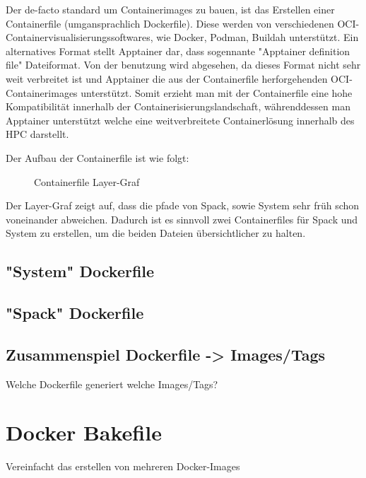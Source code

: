 Der de-facto standard um Containerimages zu bauen, ist das Erstellen einer Containerfile (umgansprachlich Dockerfile). Diese werden von verschiedenen OCI-Containervisualisierungssoftwares, wie Docker, Podman, Buildah unterstützt. Ein alternatives Format stellt Apptainer dar, dass sogennante "Apptainer definition file" Dateiformat. Von der benutzung wird abgesehen, da dieses Format nicht sehr weit verbreitet ist und Apptainer die aus der Containerfile herforgehenden OCI-Containerimages unterstützt. Somit erzieht man mit der Containerfile eine hohe Kompatibilität innerhalb der Containerisierungslandschaft, währenddessen man Apptainer unterstützt welche eine weitverbreitete Containerlösung innerhalb des HPC darstellt. 

Der Aufbau der Containerfile ist wie folgt:

\begin{figure}[!htbp]
    \centering
    
    \caption{Containerfile Layer-Graf}
\end{figure}

Der Layer-Graf zeigt auf, dass die pfade von Spack, sowie System sehr früh schon voneinander abweichen. Dadurch ist es sinnvoll zwei Containerfiles für Spack und System zu erstellen, um die beiden Dateien übersichtlicher zu halten. 

\subsection{"System" Dockerfile}



\subsection{"Spack" Dockerfile}

\subsection{Zusammenspiel Dockerfile -> Images/Tags}
Welche Dockerfile generiert welche Images/Tags?

\section{Docker Bakefile}

Vereinfacht das erstellen von mehreren Docker-Images